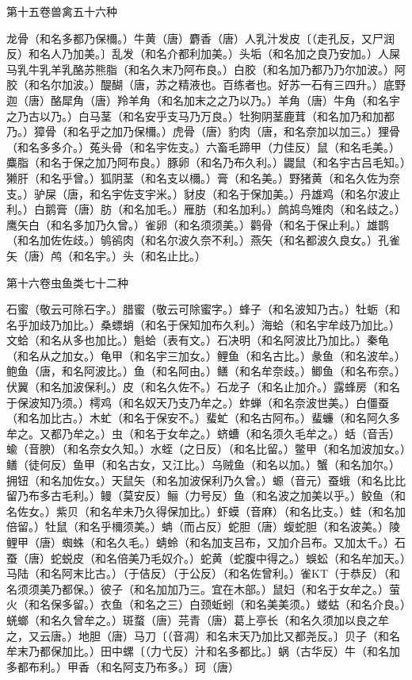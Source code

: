 \documentclass[a4paper,12pt,UTF8,twoside]{ctexbook}
\begin{document}
第十五卷兽禽五十六种

龙骨（和名多都乃保檷。）牛黄（唐）麝香（唐）人乳汁发皮〔（走孔反，又尸润反）和名人乃加美。〕乱发（和名介都利加美。）头垢（和名加之良乃安加。）人屎马乳牛乳羊乳酪苏熊脂（和名久末乃阿布良。）白胶（和名加乃都乃乃尔加波。）阿胶（和名尔加波。）醍醐（唐，苏之精液也。百练者也。好苏一石有三四升。）底野迦（唐）酪犀角（唐）羚羊角（和名加末之之乃以乃。）羊角（唐）牛角（和名宇之乃古以乃。）白马茎（和名安乎支马乃万良。）牡狗阴茎鹿茸（和名加乃和加都乃。）獐骨（和名乎之加乃保檷。）虎骨（唐）豹肉（唐，和名奈加以加三。）狸骨（和名多多介。）菟头骨（和名宇佐支。）六畜毛蹄甲（力佳反）鼠（和名毛美。）麋脂（和名于保之加乃阿布良。）豚卵（和名乃布久利。）鼹鼠（和名宇古吕毛知。）獭肝（和名乎曾。）狐阴茎（和名支以檷。）膏（和名美。）野猪黄（和名久佐为奈支。）驴屎（唐，和名宇佐支宇米。）豺皮（和名于保加美。）丹雄鸡（和名尔波止利。）白鹅膏（唐）肪（和名加毛。）雁肪（和名加利。）鹧鸪鸟雉肉（和名歧之。）鹰矢白（和名多加乃久曾。）雀卵（和名须须美。）鹳骨（和名于保止利。）雄鹊（和名加佐佐歧。）鸲鹆肉（和名尔波久奈不利。）燕矢（和名都波久良女。）孔雀矢（唐）鸬（和名宇。）头（和名止比。）

第十六卷虫鱼类七十二种

石蜜（敬云可除石字。）腊蜜（敬云可除蜜字。）蜂子（和名波知乃古。）牡蛎（和名乎加歧乃加比。）桑螵蛸（和名于保知加布久利。）海蛤（和名宇牟歧乃加比。）文蛤（和名从多也加比。）魁蛤（表有文。）石决明（和名阿波比乃加比。）秦龟（和名从之加女。）龟甲（和名宇三加女。）鲤鱼（和名古比。）彖鱼（和名波牟。）鲍鱼（唐，和名阿波比。）鱼（和名阿由。）鳝（和名牟奈歧。）鲫鱼（和名布奈。）伏翼（和名加波保利。）皮（和名久佐不。）石龙子（和名止加介。）露蜂房（和名于保波知乃须。）樗鸡（和名奴天乃支乃牟之。）蚱蝉（和名奈波世美。）白僵蚕（和名加比古。）木虻（和名于保安不。）蜚虻（和名古阿布。）蜚蠊（和名阿久多牟之。又都乃牟之。）虫（和名于女牟之。）蛴螬（和名须久毛牟之。）蛞（音舌）蝓（音腴）（和名奈女久知。）水蛭（之日反）（和名比留。）鳖甲（和名加波加女。）鳝（徒何反）鱼甲（和名古女，又江比。）乌贼鱼（和名以加。）蟹（和名加尔。）拥钮（和名加佐女。）天鼠矢（和名加波保利乃久曾。）螈（音元）蚕蛾（和名比比留乃布多古毛利。）鳗（莫安反）鲡（力号反）鱼（和名波之加美以乎。）鲛鱼（和名佐女。）紫贝（和名牟未乃久得保加比。）虾蟆（音麻）（和名比支。）蛙（和名加倍留。）牡鼠（和名乎檷须美。）蚺（而占反）蛇胆（唐）蝮蛇胆（和名波美。）陵鲤甲（唐）蜘蛛（和名久毛。）蜻蛉（和名加支吕布，又加介吕布。又加太千。）石蚕（唐）蛇蜕皮（和名倍美乃毛奴介。）蛇黄（蛇腹中得之。）蜈蚣（和名牟加天。）马陆（和名阿末比古。）（于佶反）（于公反）（和名佐曾利。）雀KT（于恭反）（和名须须美乃都保。）彼子（和名加加乃三。宜在木部。）鼠妇（和名于女牟之。）萤火（和名保多留。）衣鱼（和名之三）白颈蚯蚓（和名美美须。）蝼蛄（和名介良。）蜣螂（和名久曾牟之。）斑蝥（唐）芫青（唐）葛上亭长（和名久须加以良之牟之，又云唐。）地胆（唐）马刀〔（音凋）和名末天乃加比又都尧反。〕贝子（和名牟末乃都保加比。）田中螺〔（力弋反）汁和名多都比。〕蜗（古华反）牛（和名加多都布利。）甲香（和名阿支乃布多。）珂（唐）
\end{document}
